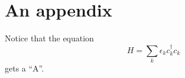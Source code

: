 

\chapter{An appendix}\label{ch:appendixA}
Notice that the equation
\begin{equation}\label{eq:equation1}
	H = \sum_{k}\epsilon_kc_k^\dagger c_k
\end{equation}
gets a ``A''.